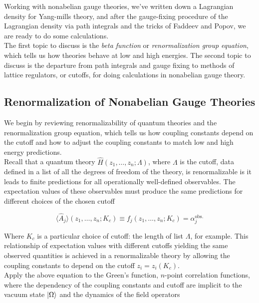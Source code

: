 
\noindent Working with nonabelian gauge theories, we've written down a Lagrangian density for Yang-mills theory, and after the gauge-fixing procedure of the Lagrangian density via path integrals and the tricks of Faddeev and Popov, we are ready to do some calculations. \\

\noindent The first topic to discuss is the \textit{beta function} or \textit{renormalization group equation}, which tells us how theories behave at low and high energies. The second topic to discuss is the departure from path integrals and gauge fixing to methods of lattice regulators, or cutoffs, for doing calculations in nonabelian gauge theory. \\

\subsection*{Renormalization of Nonabelian Gauge Theories}

\noindent We begin by reviewing renormalizability of quantum theories and the renormalization group equation, which tells us how coupling constants depend on the cutoff and how to adjust the coupling constants to match low and high energy predictions.  \\

\noindent Recall that a quantum theory $\hat{H}(z_1, \dots, z_n; \Lambda)$, where $\Lambda$ is the cutoff, data defined in a list of all the degrees of freedom of the theory, is renormalizable is it leads to finite predictions for all operationally well-defined observables. The expectation values of these observables must produce the same predictions for different choices of the chosen cutoff

\begin{equation}
\langle \hat{A}_j \rangle (z_1, \dots, z_n; K_c) \equiv f_j (z_1, \dots , z_n; K_c) = \alpha_j^{\text{obs.}}
\end{equation}

\noindent Where $K_c$ is a particular choice of cutoff: the length of list $\Lambda$, for example. This relationship of expectation values with different cutoffs yielding the same observed quantities is achieved in a renormalizable theory by allowing the coupling constants to depend on the cutoff $z_i  =z_i (K_c)$. \\

\noindent Apply the above equation to the Green's function, $n$-point correlation functions, where the dependency of the coupling constants and cutoff are implicit to the vacuum state $\ket{\Omega}$ and the dynamics of the field operators

